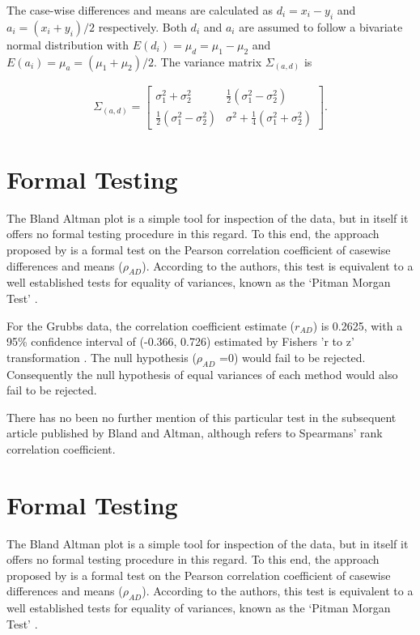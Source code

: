 \documentclass[12pt, a4paper]{report}
\theoremstyle{plain}
\theoremstyle{definition}
\theoremstyle{remark}
\begin{document}
	
	The case-wise differences and means are calculated as $d_{i} =
	x_{i}-y_{i}$ and $a_{i} = (x_{i}+y_{i})/2$  respectively. Both
	$d_{i}$ and $a_{i}$ are assumed to follow a bivariate normal
	distribution with $E(d_{i})= \mu_{d} = \mu_{1} - \mu_{2}$ and
	$E(a_{i})= \mu_{a} = (\mu_{1} + \mu_{2})/2$. The variance matrix
	$\Sigma_{(a,d)}$ is
	
	\begin{eqnarray}
	\Sigma_{(a,d)}= \left[\begin{matrix}
	\sigma^{2}_{1}+\sigma^{2}_{2}&\frac{1}{2}(\sigma^{2}_{1}-\sigma^{2}_{2})\\
	\frac{1}{2}(\sigma^{2}_{1}-\sigma^{2}_{2})&\sigma^{2}+
	\frac{1}{4}(\sigma^{2}_{1}+\sigma^{2}_{2})
	\end{matrix} \right].
	\end{eqnarray}
	
	
	
	
	\section{Formal Testing}
	The Bland Altman plot is a simple tool for inspection of the data,
	but in itself it offers no formal testing procedure in this
	regard. To this end, the approach proposed by \citet{BA83} is a
	formal test on the Pearson correlation coefficient  of casewise
	differences and means ($\rho_{AD}$). According to the authors,
	this test is equivalent to a well established tests for equality
	of variances, known as the `Pitman Morgan Test' \citep{Pitman,
		Morgan}.
	
	For the Grubbs data, the correlation coefficient estimate
	($r_{AD}$) is 0.2625, with a 95\% confidence interval of (-0.366,
	0.726) estimated by Fishers 'r to z' transformation \citep{Cohen}.
	The null hypothesis ($\rho_{AD}$ =0) would fail to be rejected.
	Consequently the null hypothesis of equal variances of each method
	would also fail to be rejected.
	
	There has no been no further mention of this particular test in
	the subsequent article published by Bland and Altman, although
	\citet{BA99} refers to Spearmans' rank correlation coefficient.
	
	
	\newpage
	\section{Formal Testing}
	The Bland Altman plot is a simple tool for inspection of the data,
	but in itself it offers no formal testing procedure in this
	regard. To this end, the approach proposed by \citet{BA83} is a
	formal test on the Pearson correlation coefficient  of casewise
	differences and means ($\rho_{AD}$). According to the authors,
	this test is equivalent to a well established tests for equality
	of variances, known as the `Pitman Morgan Test' \citep{Pitman,
		Morgan}.
	
\end{document}
